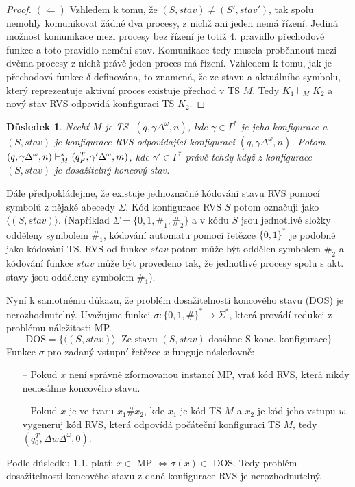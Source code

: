 \documentclass[a4paper,12pt]{article}
\newcounter{counten}
\newtheorem{corollary}{Důsledek}[counten]
\begin{document}
\begin{enumerate}[label=\textbf{\arabic*}.]
\begin{proof}
 $(\Leftarrow)$ Vzhledem k tomu, že $(S, stav) \neq (S', stav')$, tak spolu nemohly komunikovat žádné dva procesy, z nichž ani jeden nemá řízení.  
 Jediná možnost komunikace mezi procesy bez řízení je totiž 4. pravidlo přechodové funkce a toto pravidlo nemění stav.
 Komunikace tedy musela proběhnout mezi dvěma procesy z nichž právě jeden proces má řízení. Vzhledem k tomu, jak je
 přechodová funkce $\delta$ definována, to znamená, že ze stavu a aktuálního symbolu, který reprezentuje aktivní proces existuje
 přechod v TS $M$. Tedy $K_1 \vdash_M K_2$ a nový stav RVS odpovídá konfiguraci TS $K_2$.
 \end{proof}
 \begin{corollary}
   Nechť $M$ je TS, $(q, \gamma\Delta^{\omega}, n)$, kde $\gamma\in\Gamma^*$ je jeho konfigurace a $(S, stav)$ je konfigurace RVS odpovídající 
   konfiguraci $(q, \gamma\Delta^{\omega}, n)$. Potom $(q, \gamma\Delta^{\omega}, n) \\\vdash^*_M (q^T_F, \gamma'\Delta^{\omega}, m)$, kde $\gamma'\in\Gamma^*$ právě tehdy
   když z konfigurace $(S, stav)$ je dosažitelný koncový stav.
 \end{corollary}

 Dále předpokládejme, že existuje jednoznačné kódování stavu RVS pomocí symbolů z nějaké abecedy $\Sigma$. Kód konfigurace
 RVS $S$ potom označuji jako $\langle (S, stav)\rangle$. (Například $\Sigma = \{0,1,\#_1, \#_2\}$ a v kódu $S$ jsou
 jednotlivé složky odděleny symbolem $\#_1$, kódování automatu pomocí řetězce $\{0,1\}^*$ je podobné jako kódování TS.
 RVS od funkce $stav$ potom může být oddělen symbolem $\#_2$ a kódování funkce $stav$ může být provedeno tak, že jednotlivé procesy spolu s akt. stavy jsou odděleny symbolem $\#_1$).
 
 Nyní k samotnému důkazu, že problém dosažitelnosti koncového stavu (DOS) je nerozhodnutelný. Uvažujme funkci $\sigma: \{0,1,\#\}^*\rightarrow \Sigma^*$,
 která provádí redukci z problému náležitosti MP. $$\mbox{DOS} = \{\langle (S, stav)\rangle | \mbox{ Ze stavu } (S, stav) \mbox{ dosáhne S konc. konfigurace}\}$$
 Funkce $\sigma$ pro zadaný vstupní řetězec $x$ funguje následovně:
 \begin{itemize}
  \item[--] Pokud $x$ není správně zformovanou instancí MP, vrať kód RVS, která nikdy nedosáhne koncového stavu.
  \item[--] Pokud $x$ je ve tvaru $x_1\#x_2$, kde $x_1$ je kód TS $M$ a $x_2$ je kód jeho vstupu $w$, vygeneruj 
    kód RVS, která odpovídá počáteční konfiguraci TS $M$, tedy $(q_0^T, \Delta w\Delta^{\omega}, 0)$.
 \end{itemize}
 
 Podle důsledku 1.1. platí: $x\in $ MP $\Leftrightarrow \sigma(x) \in$ DOS. Tedy problém dosažitelnosti koncového
 stavu z dané konfigurace RVS je nerozhodnutelný.

\end{enumerate}
\end{document}
